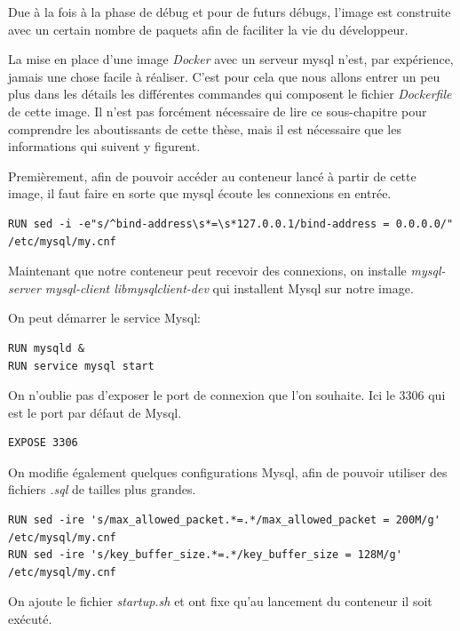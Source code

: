 Due à la fois à la phase de débug et pour de futurs débugs, l'image est construite avec un certain nombre de paquets afin de faciliter la vie du développeur.

La mise en place d'une image \emph{Docker} avec un serveur mysql n'est, par expérience, jamais une chose facile à réaliser. C'est pour cela que nous allons entrer un peu plus dans les détails les différentes commandes qui composent le fichier \emph{Dockerfile} de cette image. Il n'est pas forcément nécessaire de lire ce sous-chapitre pour comprendre les aboutissants de cette thèse, mais il est nécessaire que les informations qui suivent y figurent.

Premièrement, afin de pouvoir accéder au conteneur lancé à partir de cette image, il faut faire en sorte que mysql écoute les connexions en entrée.

\lstset{language=bash}
\begin{lstlisting}[frame=single]
RUN sed -i -e"s/^bind-address\s*=\s*127.0.0.1/bind-address = 0.0.0.0/" /etc/mysql/my.cnf
\end{lstlisting}

Maintenant que notre conteneur peut recevoir des connexions, on installe \emph{mysql-server mysql-client libmysqlclient-dev} qui installent Mysql sur notre image.

On peut démarrer le service Mysql:

\begin{lstlisting}[frame=single]
RUN mysqld &
RUN service mysql start
\end{lstlisting}

On n’oublie pas d'exposer le port de connexion que l'on souhaite. Ici le 3306 qui est le port par défaut de Mysql.

\begin{lstlisting}[frame=single]
EXPOSE 3306
\end{lstlisting}

On modifie également quelques configurations Mysql, afin de pouvoir utiliser des fichiers \emph{.sql} de tailles plus grandes.

\begin{lstlisting}[frame=single]
RUN sed -ire 's/max_allowed_packet.*=.*/max_allowed_packet = 200M/g' /etc/mysql/my.cnf
RUN sed -ire 's/key_buffer_size.*=.*/key_buffer_size = 128M/g' /etc/mysql/my.cnf
\end{lstlisting}

On ajoute le fichier \emph{startup.sh} et ont fixe qu'au lancement du conteneur il soit exécuté.

